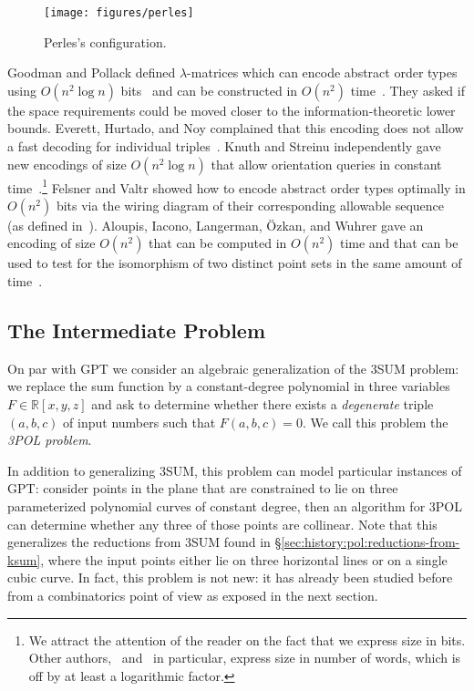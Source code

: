\begin{figure}
	\centering{}
	\texttt{[image: figures/perles]}
	\caption{Perles's configuration.}\label{fig:perles}
\end{figure}

Goodman and Pollack defined \(\lambda\)-matrices which can encode abstract order
types using \( O(n^2 \log{n}) \) bits~\cite{GP83} and can be constructed in
\(O(n^2)\) time~\cite{EOS86}. They asked if the space
requirements could be moved closer to the information-theoretic lower bounds.
Everett, Hurtado, and Noy complained that this encoding does not
allow a fast decoding for individual triples~\cite{EHN99}.
Knuth and Streinu independently gave new encodings of size \(O(n^2 \log n)\)
that allow orientation queries in constant time~\cite{Knu92,St97}.\footnote{%
We attract the attention of the reader on the fact that we express size in
bits.
Other authors,~\cite{EHN99} and~\cite{St97} in particular,
express size in number of words, which is off by at least a logarithmic factor.}
Felsner and Valtr showed how to encode abstract order types optimally in
\(O(n^2)\) bits via the wiring diagram of their corresponding allowable
sequence~\cite{Fe96, FV11} (as defined in~\cite{Go80}).
%
Aloupis,
Iacono,
Langerman,
{\"{O}}zkan,
and Wuhrer
gave
an encoding of size \(O(n^2)\) that can be computed in \(O(n^2)\) time and that
can be used to test for the isomorphism of two distinct point sets in the same
amount of time~\cite{AILOW14}.

\subsection{The Intermediate Problem}
\label{sec:history:pol:3pol}

On par with GPT we consider an algebraic generalization of the 3SUM problem:
we replace the sum function by a constant-degree polynomial in three variables
$F \in \mathbb{R}[x,y,z]$ and ask to determine whether there exists a
\emph{degenerate} triple $(a,b,c)$ of input numbers such that $F(a,b,c)=0$. We
call this problem the \emph{3POL problem}.
%


In addition to generalizing 3SUM, this problem can model particular
instances of GPT: consider points in the plane that are constrained to
lie on three parameterized polynomial curves of constant degree, then an
algorithm for 3POL can determine whether any three of those points are
collinear. Note that this generalizes the reductions from 3SUM found in
\S\ref{sec:history:pol:reductions-from-ksum}, where the input points either lie
on three horizontal lines or on a single cubic curve.
%
In fact, this problem is not new: it has already been studied before from a
combinatorics point of view as exposed in the next section.

